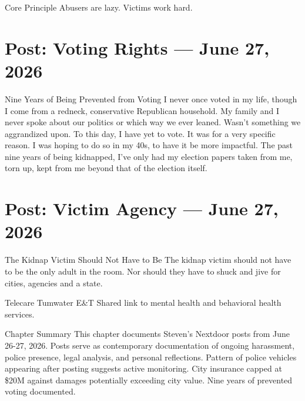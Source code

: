 \documentclass[12pt,openany]{book}
\begin{document}
\begin{writbox}{Core Principle}
Abusers are lazy. Victims work hard.
\end{writbox}

\section{Post: Voting Rights --- June 27, 2026}

\begin{evidencebox}{Nine Years of Being Prevented from Voting}
I never once voted in my life, though I come from a redneck, conservative Republican household. My family and I never spoke about our politics or which way we ever leaned. Wasn't something we aggrandized upon. To this day, I have yet to vote. It was for a very specific reason. I was hoping to do so in my 40s, to have it be more impactful. The past nine years of being kidnapped, I've only had my election papers taken from me, torn up, kept from me beyond that of the election itself.
\end{evidencebox}

\section{Post: Victim Agency --- June 27, 2026}

\begin{evidencebox}{The Kidnap Victim Should Not Have to Be}
The kidnap victim should not have to be the only adult in the room. Nor should they have to shuck and jive for cities, agencies and a state.
\end{evidencebox}

\begin{evidencebox}{Telecare Tumwater E\&T}
Shared link to mental health and behavioral health services.
\end{evidencebox}

\begin{evidencebox}{Chapter Summary}
This chapter documents Steven's Nextdoor posts from June 26-27, 2026. Posts serve as contemporary documentation of ongoing harassment, police presence, legal analysis, and personal reflections. Pattern of police vehicles appearing after posting suggests active monitoring. City insurance capped at \$20M against damages potentially exceeding city value. Nine years of prevented voting documented.
\end{evidencebox}
\end{document}
